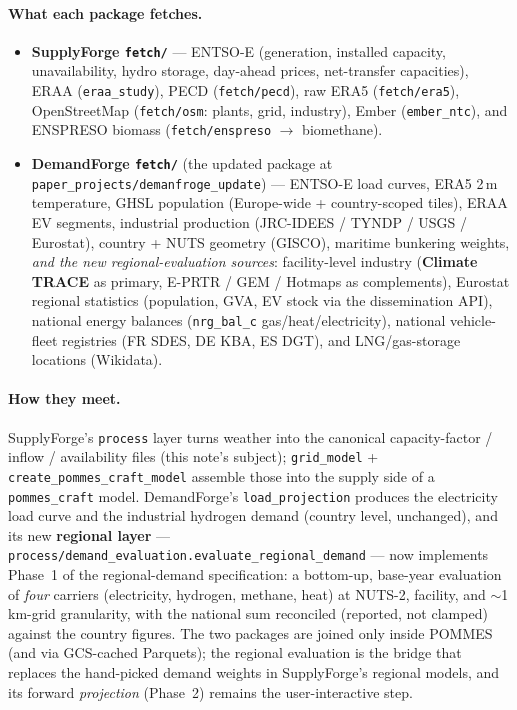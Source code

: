 \documentclass[11pt,a4paper]{article}
\begin{document}
\paragraph{What each package fetches.}
\begin{itemize}[nosep]
  \item \textbf{SupplyForge \texttt{fetch/}} --- ENTSO-E (generation, installed capacity, unavailability,
        hydro storage, day-ahead prices, net-transfer capacities), ERAA (\texttt{eraa\_study}), PECD
        (\texttt{fetch/pecd}), raw ERA5 (\texttt{fetch/era5}), OpenStreetMap (\texttt{fetch/osm}:
        plants, grid, industry), Ember (\texttt{ember\_ntc}), and ENSPRESO biomass
        (\texttt{fetch/enspreso} $\to$ biomethane).
  \item \textbf{DemandForge \texttt{fetch/}} (the updated package at
        \texttt{paper\_projects/demanfroge\_update}) --- ENTSO-E load curves, ERA5 2\,m temperature,
        GHSL population (Europe-wide + country-scoped tiles), ERAA EV segments, industrial production
        (JRC-IDEES / TYNDP / USGS / Eurostat), country + NUTS geometry (GISCO), maritime bunkering
        weights, \emph{and the new regional-evaluation sources}: facility-level industry
        (\textbf{Climate TRACE} as primary, E-PRTR / GEM / Hotmaps as complements), Eurostat regional
        statistics (population, GVA, EV stock via the dissemination API), national energy balances
        (\texttt{nrg\_bal\_c} gas/heat/electricity), national vehicle-fleet registries (FR SDES, DE KBA,
        ES DGT), and LNG/gas-storage locations (Wikidata).
\end{itemize}

\paragraph{How they meet.} SupplyForge's \texttt{process} layer turns weather into the canonical
capacity-factor / inflow / availability files (this note's subject); \texttt{grid\_model} +
\texttt{create\_pommes\_craft\_model} assemble those into the supply side of a \texttt{pommes\_craft}
model. DemandForge's \texttt{load\_projection} produces the electricity load curve and the industrial
hydrogen demand (country level, unchanged), and its new \textbf{regional layer} —
\texttt{process/demand\_evaluation.evaluate\_regional\_demand} — now implements Phase~1 of the
regional-demand specification: a bottom-up, base-year evaluation of \emph{four} carriers (electricity,
hydrogen, methane, heat) at NUTS-2, facility, and $\sim$1\,km-grid granularity, with the national sum
reconciled (reported, not clamped) against the country figures. The two packages are joined only inside
POMMES (and via GCS-cached Parquets); the regional evaluation is the bridge that replaces the hand-picked
demand weights in SupplyForge's regional models, and its forward \emph{projection} (Phase~2) remains the
user-interactive step.
\end{document}
